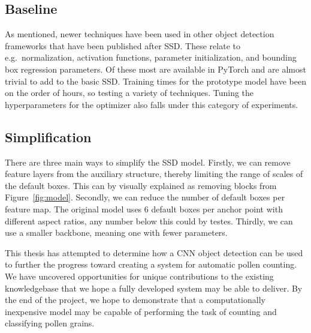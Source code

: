 \subsection*{Baseline}
As mentioned, newer techniques have been used in other object detection frameworks that have been published after SSD\@.
These relate to e.g.\ normalization, activation functions, parameter initialization, and bounding box regression parameters.
Of these most are available in PyTorch and are almost trivial to add to the basic SSD\@.
Training times for the prototype model have been on the order of hours, so testing a variety of techniques.
Tuning the hyperparameters for the optimizer also falls under this category of experiments.

\subsection*{Simplification}
There are three main ways to simplify the SSD model.
Firstly, we can remove feature layers from the auxiliary structure, thereby limiting the range of scales of the default boxes.
This can by visually explained as removing blocks from Figure~\ref{fig:model}.
Secondly, we can reduce the number of default boxes per feature map.
The original model uses 6 default boxes per anchor point with different aspect ratios, any number below this could by testes.
Thirdly, we can use a smaller backbone, meaning one with fewer parameters.

This thesis has attempted to determine how a CNN object detection can be used to further the progress toward creating a system for automatic pollen counting.
We have uncovered opportunities for unique contributions to the existing knowledgebase that we hope a fully developed system may be able to deliver.
By the end of the project, we hope to demonstrate that a computationally inexpensive model may be capable of performing the task of counting and classifying pollen grains.
